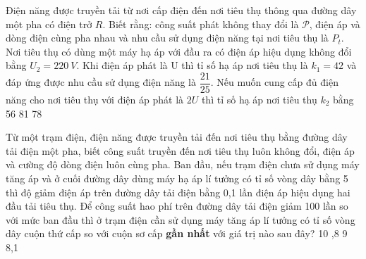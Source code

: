 \begin{vidu}%
	Điện năng được truyền tải từ nơi cấp điện đến nơi tiêu thụ thông qua đường dây một pha có điện trở $R$. Biết rằng: công suất phát không thay đổi là $\mathcal{P}$, điện áp và dòng điện cùng pha nhau và nhu cầu sử dụng điện năng tại nơi tiêu thụ là $P_t$. Nơi tiêu thụ có dùng một máy hạ áp với đầu ra có điện áp hiệu dụng không đổi bằng $U_2=220\ V$. Khi điện áp phát là U thì tỉ số hạ áp nơi tiêu thụ là $k_1=42$ và đáp ứng được nhu cầu sử dụng điện năng là $\dfrac{21}{25}$. Nếu muốn cung cấp đủ điện năng cho nơi tiêu thụ với điện áp phát là $2U$ thì tỉ số hạ áp nơi tiêu thụ $k_{2}$ bằng
	\choice
	{56}
	{81}
	{78}
	{}
\end{vidu}
\begin{vidu}%
	Từ một trạm điện, điện năng được truyền tải đến nơi tiêu thụ bằng đường dây tải điện một pha, biết công suất truyền đến nơi tiêu thụ luôn không đổi, điện áp và cường độ dòng điện luôn cùng pha. Ban đầu, nếu trạm điện chưa sử dụng máy tăng áp và ở cuối đường dây dùng máy hạ áp lí tưởng có tỉ số vòng dây bằng 5 thì độ giảm điện áp trên đường dây tải điện bằng 0,1 lần điện áp hiệu dụng hai đầu tải tiêu thụ. Để công suất hao phí trên đường dây tải điện giảm 100 lần so với mức ban đầu thì ở trạm điện cần sử dụng máy tăng áp lí tưởng có tỉ số vòng dây cuộn thứ cấp so với cuộn sơ cấp \textbf{gần nhất} với giá trị nào sau đây?
	\choice
	{10}
	{,8}
	{9}
	{8,1}
\end{vidu}
